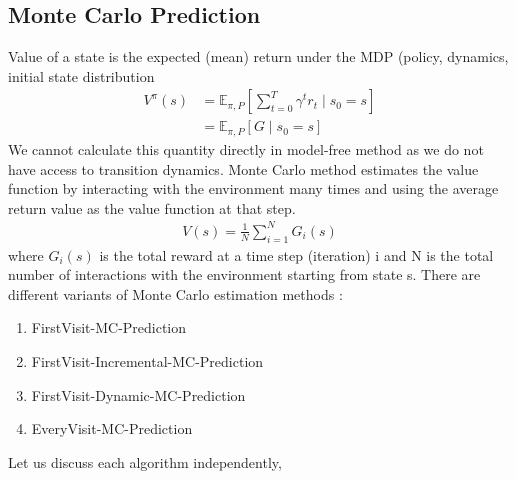 \documentclass[11pt]{article}
\begin{document}
\subsection{Monte Carlo Prediction}
Value of a state is the expected (mean) return under the MDP (policy, dynamics, initial state distribution
$$
\begin{aligned}
V^{\pi}(s) &=\mathbb{E}_{\pi, P}\left[\sum_{t=0}^{T} \gamma^{t} r_{t} \mid s_{0}=s\right] \\
&=\mathbb{E}_{\pi, P}\left[G \mid s_{0}=s\right]
\end{aligned}
$$
We cannot calculate this quantity directly in model-free method as we do not have access to transition dynamics. Monte Carlo method estimates the value function by interacting with the environment many times and using the average return value as the value function at that step.
\begin{align}
     V(s) = \frac{1}{N }\sum_{i=1}^N G_i(s)
\end{align}
where \(G_i(s)\) is the total reward at a time step (iteration) i and N is the total number of interactions with the environment starting from state s. 
There are different variants of Monte Carlo estimation methods :
\begin{enumerate}
    \item FirstVisit-MC-Prediction
    \item FirstVisit-Incremental-MC-Prediction
    \item FirstVisit-Dynamic-MC-Prediction
    \item EveryVisit-MC-Prediction
\end{enumerate}

Let us discuss each algorithm independently,
\end{document}
